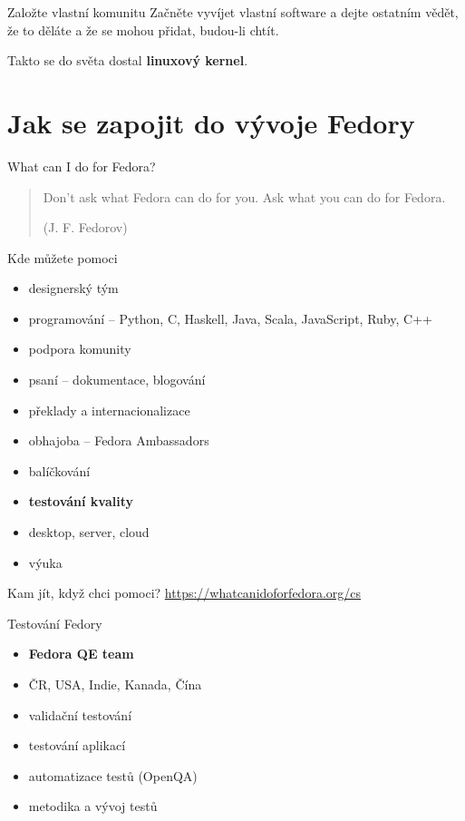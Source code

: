 \documentclass[11pt]{beamer}
\begin{document}
\begin{frame}{Založte vlastní komunitu}
	Začněte vyvíjet vlastní software a dejte ostatním vědět, že to děláte a že se mohou přidat, budou-li chtít.
	
	Takto se do světa dostal \textbf{linuxový kernel}.
\end{frame}	


\section{Jak se zapojit do vývoje Fedory}

\begin{frame}{What can I do for Fedora?}
	
\begin{quotation}
	Don't ask what Fedora can do for you. Ask what you can do for Fedora. 
	\begin{flushright}
			(J. F. Fedorov)
	\end{flushright}	
\end{quotation}
\end{frame}

\begin{frame}{Kde můžete pomoci}
	\begin{itemize}
		\item designerský tým
		\item programování -- Python, C, Haskell, Java, Scala, JavaScript, Ruby, C++ 
		\item podpora komunity
		\item psaní -- dokumentace, blogování
		\item překlady a internacionalizace
		\item obhajoba -- Fedora Ambassadors
		\item balíčkování
		\item \textbf{testování kvality}
		\item desktop, server, cloud
		\item výuka
	\end{itemize}
\end{frame}

\begin{frame}{Kam jít, když chci pomoci?}
	\url{https://whatcanidoforfedora.org/cs}
\end{frame}

\begin{frame}{Testování Fedory}
	\begin{itemize}
		\item \textbf{Fedora QE team}
		\item ČR, USA, Indie, Kanada, Čína
		\item validační testování
		\item testování aplikací
		\item automatizace testů (OpenQA)
		\item metodika a vývoj testů
	\end{itemize}
\end{frame}
\end{document}
